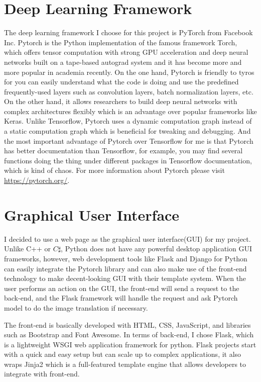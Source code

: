 \section{Deep Learning Framework}
The deep learning framework I choose for this project is PyTorch from Facebook Inc. 
Pytorch is the Python implementation of the famous framework Torch, which offers tensor computation 
with strong GPU acceleration and deep neural networks built on a tape-based autograd system 
and it has become more and more popular in academia recently. 
On the one hand, Pytorch is friendly to tyros for 
you can easily understand what the code is doing and use the predefined 
frequently-used layers such as convolution layers, batch normalization layers, 
etc. On the other hand, it allows researchers to build deep neural networks with complex 
architectures flexibly which is an advantage over popular frameworks like Keras.
Unlike Tensorflow, Pytorch uses a dynamic computation graph instead 
of a static computation graph which is beneficial for tweaking and debugging. And 
the most important advantage of Pytorch over Tensorflow for me is that Pytorch 
has better documentation than Tensorflow, for example, you may find several 
functions doing the thing under different packages in Tensorflow documentation,
which is kind of chaos. For more information about Pytorch please visit 
\href{https://pytorch.org/}{https://pytorch.org/}.

\section{Graphical User Interface}
I decided to use a web page as the graphical user interface(GUI) for my project.
Unlike C++ or $C\sharp$, Python does not have any powerful desktop application GUI 
frameworks, however, 
web development tools like Flask and Django for Python can easily integrate the Pytorch 
library and can also make use of the front-end technology to make decent-looking 
GUI with their template system. 
When the user performs an action on the GUI, the front-end will send a request to 
the back-end, and the Flask framework will handle the request and ask Pytorch model to 
do the image translation if necessary. 

The front-end is basically developed with HTML, 
CSS, JavaScript, and libraries such as Bootstrap and Font Awesome.
In terms of back-end, I chose Flask, which is a lightweight WSGI web application 
framework for python. Flask projects start with a quick and easy setup but can scale 
up to complex applications, it also wraps Jinja2 which is a full-featured template 
engine that allows developers to integrate with front-end. 

